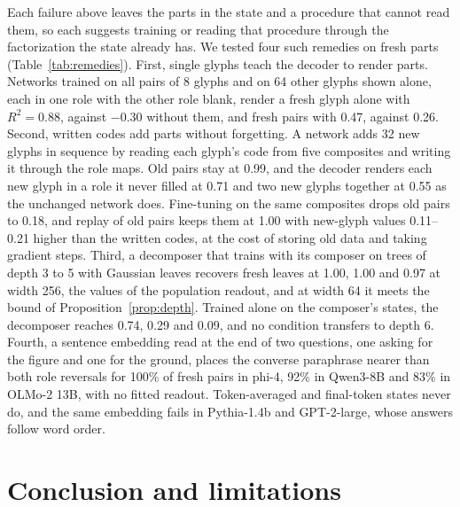 \documentclass[10pt]{article}
\theoremstyle{plain}
\theoremstyle{remark}
\begin{document}
Each failure above leaves the parts in the state and a procedure that cannot read them, so each suggests training or reading that procedure through the factorization the state already has. We tested four such remedies on fresh parts (Table~\ref{tab:remedies}). First, single glyphs teach the decoder to render parts. Networks trained on all pairs of 8 glyphs and on 64 other glyphs shown alone, each in one role with the other role blank, render a fresh glyph alone with $R^2 = 0.88$, against $-0.30$ without them, and fresh pairs with 0.47, against 0.26. Second, written codes add parts without forgetting. A network adds 32 new glyphs in sequence by reading each glyph's code from five composites and writing it through the role maps. Old pairs stay at 0.99, and the decoder renders each new glyph in a role it never filled at 0.71 and two new glyphs together at 0.55 as the unchanged network does. Fine-tuning on the same composites drops old pairs to 0.18, and replay of old pairs keeps them at 1.00 with new-glyph values 0.11--0.21 higher than the written codes, at the cost of storing old data and taking gradient steps. Third, a decomposer that trains with its composer on trees of depth 3 to 5 with Gaussian leaves recovers fresh leaves at 1.00, 1.00 and 0.97 at width 256, the values of the population readout, and at width 64 it meets the bound of Proposition~\ref{prop:depth}. Trained alone on the composer's states, the decomposer reaches 0.74, 0.29 and 0.09, and no condition transfers to depth 6. Fourth, a sentence embedding read at the end of two questions, one asking for the figure and one for the ground, places the converse paraphrase nearer than both role reversals for 100\% of fresh pairs in phi-4, 92\% in Qwen3-8B and 83\% in OLMo-2 13B, with no fitted readout. Token-averaged and final-token states never do, and the same embedding fails in Pythia-1.4b and GPT-2-large, whose answers follow word order.


\section{Conclusion and limitations}
\label{sec:discussion}
\end{document}
